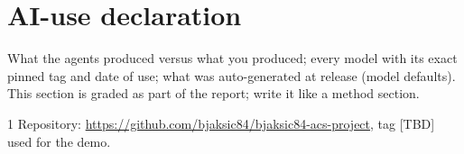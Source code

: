 \documentclass[a4paper]{article}
\begin{document}
\section{AI-use declaration}
What the agents produced versus what you produced; every model with its exact
pinned tag and date of use; what was auto-generated at release (model defaults).
This section is graded as part of the report; write it like a method section.

\small
\begin{thebibliography}{1}
 Repository: \url{https://github.com/bjaksic84/bjaksic84-acs-project}, tag [TBD] used for the demo.
\end{thebibliography}
\end{document}

